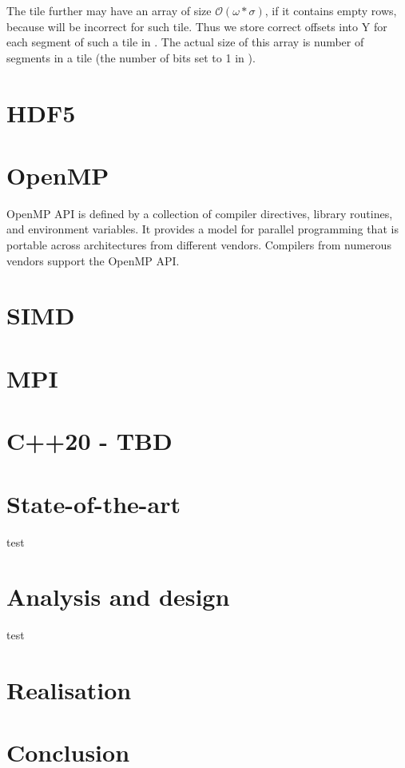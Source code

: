 \documentclass[thesis=M,english]{FITthesis}[2019/12/23]
\begin{document}
The tile further may have an  array of size $\mathcal{O}(\omega * \sigma)$, if it contains empty rows, 
because  will be incorrect for such tile. Thus we store correct offsets into Y for each segment of such 
a tile in . The actual size of this array is number of segments in a tile (the number of bits set to 1 in ).



\chapter{HDF5}



\chapter{OpenMP}

OpenMP API is defined by a collection of compiler directives, library routines, and environment variables.
It provides a model for parallel programming that is portable across architectures
from different vendors. Compilers from numerous vendors support the OpenMP API. \cite{openmp18}

\chapter{SIMD}

\chapter{MPI}
\chapter{C++20 - TBD}

\chapter{State-of-the-art}
test
\chapter{Analysis and design}
test
\chapter{Realisation}

\chapter{Conclusion}
\end{document}
